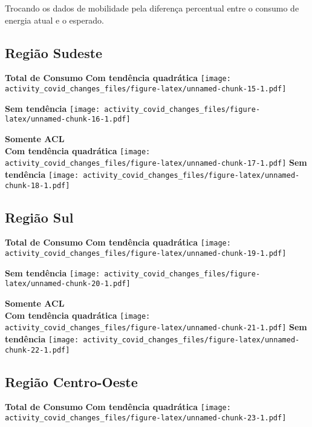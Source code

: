 \documentclass[
]{article}
\begin{document}
Trocando os dados de mobilidade pela diferença percentual entre o
consumo de energia atual e o esperado.

\hypertarget{regiuxe3o-sudeste-1}{%
\subsection{Região Sudeste}\label{regiuxe3o-sudeste-1}}

\textbf{Total de Consumo} \textbf{Com tendência quadrática}
\texttt{[image: activity\_covid\_changes\_files/figure-latex/unnamed-chunk-15-1.pdf]}

\textbf{Sem tendência}
\texttt{[image: activity\_covid\_changes\_files/figure-latex/unnamed-chunk-16-1.pdf]}

\pagebreak

\textbf{Somente ACL}\\
\textbf{Com tendência quadrática}
\texttt{[image: activity\_covid\_changes\_files/figure-latex/unnamed-chunk-17-1.pdf]}
\textbf{Sem tendência}
\texttt{[image: activity\_covid\_changes\_files/figure-latex/unnamed-chunk-18-1.pdf]}

\pagebreak

\hypertarget{regiuxe3o-sul-1}{%
\subsection{Região Sul}\label{regiuxe3o-sul-1}}

\textbf{Total de Consumo} \textbf{Com tendência quadrática}
\texttt{[image: activity\_covid\_changes\_files/figure-latex/unnamed-chunk-19-1.pdf]}

\textbf{Sem tendência}
\texttt{[image: activity\_covid\_changes\_files/figure-latex/unnamed-chunk-20-1.pdf]}

\pagebreak

\textbf{Somente ACL}\\
\textbf{Com tendência quadrática}
\texttt{[image: activity\_covid\_changes\_files/figure-latex/unnamed-chunk-21-1.pdf]}
\textbf{Sem tendência}
\texttt{[image: activity\_covid\_changes\_files/figure-latex/unnamed-chunk-22-1.pdf]}

\pagebreak

\hypertarget{regiuxe3o-centro-oeste-1}{%
\subsection{Região Centro-Oeste}\label{regiuxe3o-centro-oeste-1}}

\textbf{Total de Consumo} \textbf{Com tendência quadrática}
\texttt{[image: activity\_covid\_changes\_files/figure-latex/unnamed-chunk-23-1.pdf]}
\end{document}
